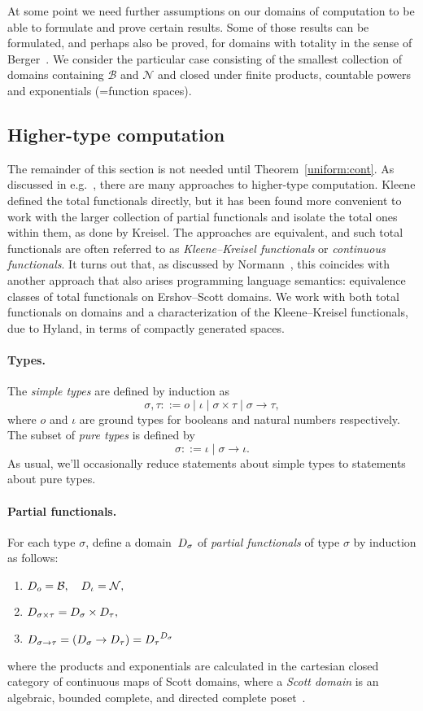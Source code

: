 \documentclass{LMCS}
\newcommand{\myparagraph}{\paragraph}
\newcommand{\licsmath}[1]{\[ #1 \]}
\newcommand{\licsmathtt}[3]{\begin{enumerate}
\item[] \quad $#1$
\item[] \quad $#2$
\item[] \quad $#3$
\end{enumerate}}
\newcommand{\bnf}{\mathrel{::=}}
\newcommand{\pN}{\mathcal{N}}
\newcommand{\pBool}{\mathcal{B}}
\newcommand{\tproduct}{\sigma \times \tau}
\newcommand{\tfunction}{\sigma \to \tau}
\begin{document}
At some point we need further assumptions on our domains of
computation to be able to formulate and prove certain results. Some of
those results can be formulated, and perhaps also be proved, for
domains with totality in the sense of Berger~\cite{berger:total}.  We
consider the particular case consisting of the smallest collection of
domains containing $\pBool$ and $\pN$ and closed under finite
products, countable powers and exponentials (=function spaces).

\subsection{Higher-type computation} \label{higher:background}

The remainder of this section is not needed until
Theorem~\ref{uniform:cont}.  As discussed in
e.g.~\cite{normann:computer,MR2143877,longley:ubiquitous}, there are
many approaches to higher-type computation.  Kleene defined the total
functionals directly, but it has been found more convenient to work
with the larger collection of partial functionals and isolate the
total ones within them, as done by Kreisel. The approaches are
equivalent, and such total functionals are often referred to as
\emph{Kleene--Kreisel functionals} or \emph{continuous functionals}.
It turns out that, as discussed by Normann~\cite{normann:computer},
this coincides with another approach that also arises programming
language semantics: equivalence classes of total functionals on
Ershov--Scott domains.  We work with both total functionals on domains
and a characterization of the Kleene--Kreisel functionals, due to
Hyland, in terms of compactly generated spaces.


\myparagraph{Types.}  The \emph{simple types} are defined by induction
as
\licsmath{\sigma,\tau \bnf o \mid \iota \mid \tproduct \mid \tfunction,}
where $o$ and $\iota$ are ground types for booleans and natural
numbers respectively.  The subset of \emph{pure types} is defined by
\licsmath{\sigma \bnf \iota \mid \sigma \to \iota.}  As usual, we'll
occasionally reduce statements about simple types to statements about
pure types.


\myparagraph{Partial functionals.}  
For each type $\sigma$, define a domain~${D_{\sigma}}$ of
\emph{partial functionals} of type $\sigma$ by induction as follows:
\licsmathtt{\domain{o} = \pBool, \quad \domain{\iota} = \pN,}
{\domain{\tproduct} = \domain{\sigma} \times
  \domain{\tau},}{\domain{\tfunction} = (\domain{\sigma} \to
  \domain{\tau}) = \domain{\tau}^{\domain{\sigma}}} where the products
and exponentials are calculated in the cartesian closed category of
continuous maps of Scott domains, where a \emph{Scott domain} is an
algebraic, bounded complete, and directed complete
poset~\cite{abramsky:jung}.
\end{document}
